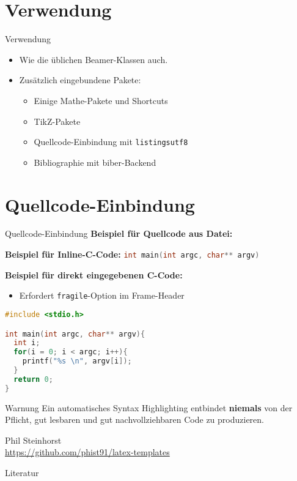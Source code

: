\documentclass[10pt,
  wide,
  xcolor={x11names},
  hyperref={colorlinks=false},
  pantone312]{beamer}    %
\begin{document}
\section{Verwendung}
\begin{frame}[t]{Verwendung}
  \begin{itemize}[<+->]
    \item Wie die üblichen Beamer-Klassen auch.
    \item Zusätzlich eingebundene Pakete:
    \begin{itemize}
      \item Einige Mathe-Pakete und Shortcuts
      \item TikZ-Pakete
      \item Quellcode-Einbindung mit \texttt{listingsutf8}
      \minoritem {}
      \item Bibliographie mit biber-Backend \cite{biblatex-ctan}
    \end{itemize}
  \end{itemize}
\end{frame}

\section{Quellcode-Einbindung}
\begin{frame}[t]{Quellcode-Einbindung}
  \textbf{Beispiel für Quellcode aus Datei:}
  
  
  \textbf{Beispiel für Inline-C-Code:} \lstinline[language=c]|int main(int argc, char** argv)|
\end{frame}

\begin{frame}[t,fragile]{}
\textbf{Beispiel für direkt eingegebenen C-Code:}
\begin{itemize}
  \item Erfordert \texttt{fragile}-Option im Frame-Header
\end{itemize}

\begin{lstlisting}[language=c]
#include <stdio.h>

int main(int argc, char** argv){
  int i;
  for(i = 0; i < argc; i++){
    printf("%s \n", argv[i]);
  }
  return 0;
}
\end{lstlisting}
\end{frame}

\begin{frame}[c]{}
  \begin{alertblock}{Warnung}
    Ein automatisches Syntax Highlighting entbindet \textbf{niemals} von der Pflicht, gut lesbaren und gut nachvollziehbaren Code zu produzieren.
  \end{alertblock}
  
  \pause
  
  \begin{flushright}
  Phil Steinhorst \\
  \url{https://github.com/phist91/latex-templates}
  \end{flushright}
\end{frame}

\begin{frame}[c]{Literatur}
  \printbibliography
\end{frame}
\end{document}
